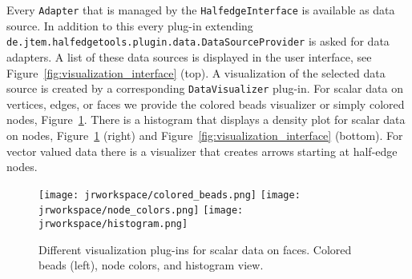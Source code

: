 \documentclass[Thesis.tex]{subfiles}
\begin{document}
Every {\tt Adapter} that is managed by the {\tt HalfedgeInterface} is available as data source. In 
addition to this every plug-in extending {\tt de.jtem.half\-edgetools.plugin.data.Data\-Source\-Provider} 
is asked for data adapters. A list of these data sources is displayed in the user interface, see 
Figure~\ref{fig:visualization_interface} (top). A visualization of the selected data source is created by a
corresponding {\tt DataVisualizer} plug-in. For scalar data on vertices, edges, or faces we provide the 
colored beads visualizer or simply colored nodes, Figure~\ref{fig:visualizers}. There is a histogram that displays a density
plot for scalar data on nodes, Figure~\ref{fig:visualizers} (right) and Figure~\ref{fig:visualization_interface} (bottom). For vector valued data 
there is a visualizer that creates arrows starting at half-edge nodes.


\begin{figure}
	\centering
	\texttt{[image: jrworkspace/colored\_beads.png]}
	\texttt{[image: jrworkspace/node\_colors.png]}
	\texttt{[image: jrworkspace/histogram.png]}
	\caption[Visualizers]{Different visualization plug-ins for scalar data on faces. Colored beads (left),
		node colors, and histogram view.}
	\label{fig:visualizers}
\end{figure}

\subfilebibliography
\end{document}

